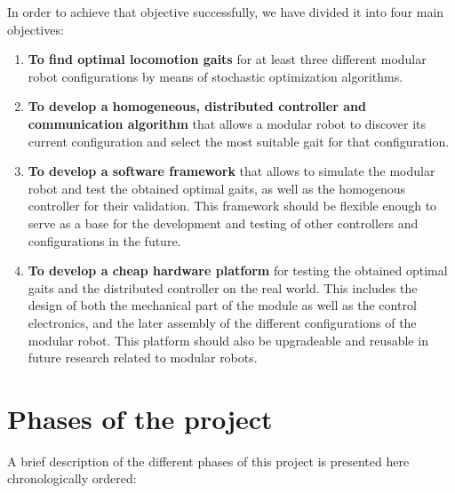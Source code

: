 In order to achieve that objective successfully, we have divided it into four main objectives:
\begin{enumerate}
	\item \textbf{To find optimal locomotion gaits} for at least three different modular robot configurations by means of stochastic optimization algorithms.\\
	
	\item \textbf{To develop a homogeneous, distributed controller and communication algorithm} that allows a modular robot to discover its current configuration and select the most suitable gait for that configuration. \\	

	\item \textbf{To develop a software framework} that allows to simulate the modular robot and test the obtained optimal gaits, as well as the homogenous controller for their validation. This framework should be flexible enough to serve as a base for the development and testing of other controllers and configurations in the future.\\
	
	\item \textbf{To develop a cheap hardware platform} for testing the obtained optimal gaits and the distributed controller on the real world. This includes the design of both the mechanical part of the module as well as the control electronics, and the later assembly of the different configurations of the modular robot. This platform should also be upgradeable and reusable in future research related to modular robots.\\
\end{enumerate}

\newpage
\section{Phases of the project}
\label{introduction_phases}

\noindent
A brief description of the different phases of this project is presented here chronologically ordered:

